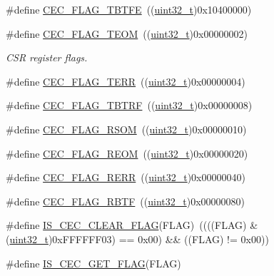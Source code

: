 \begin{DoxyCompactItemize}
\item 
\#define \hyperlink{group___c_e_c__flags__definition_gaae90fd2f95085e113b6943bb35d899ba}{C\+E\+C\+\_\+\+F\+L\+A\+G\+\_\+\+T\+B\+T\+FE}~((\hyperlink{_p_e___types_8h_a33594304e786b158f3fb30289278f5af}{uint32\+\_\+t})0x10400000)
\item 
\#define \hyperlink{group___c_e_c__flags__definition_gad0adfb11294f562f2c8dc555f69e25e0}{C\+E\+C\+\_\+\+F\+L\+A\+G\+\_\+\+T\+E\+OM}~((\hyperlink{_p_e___types_8h_a33594304e786b158f3fb30289278f5af}{uint32\+\_\+t})0x00000002)
\begin{DoxyCompactList}\small\item\em C\+SR register flags. \end{DoxyCompactList}\item 
\#define \hyperlink{group___c_e_c__flags__definition_ga7edc608ca7b4ea74dd4d795fa3214c11}{C\+E\+C\+\_\+\+F\+L\+A\+G\+\_\+\+T\+E\+RR}~((\hyperlink{_p_e___types_8h_a33594304e786b158f3fb30289278f5af}{uint32\+\_\+t})0x00000004)
\item 
\#define \hyperlink{group___c_e_c__flags__definition_gaeb02634fdd06f4ea0990e2cf23cf200e}{C\+E\+C\+\_\+\+F\+L\+A\+G\+\_\+\+T\+B\+T\+RF}~((\hyperlink{_p_e___types_8h_a33594304e786b158f3fb30289278f5af}{uint32\+\_\+t})0x00000008)
\item 
\#define \hyperlink{group___c_e_c__flags__definition_ga4e352d4f48e3b197edf150860703d2bf}{C\+E\+C\+\_\+\+F\+L\+A\+G\+\_\+\+R\+S\+OM}~((\hyperlink{_p_e___types_8h_a33594304e786b158f3fb30289278f5af}{uint32\+\_\+t})0x00000010)
\item 
\#define \hyperlink{group___c_e_c__flags__definition_gaffeaec4eafbf1efbd88139b9bb0654a7}{C\+E\+C\+\_\+\+F\+L\+A\+G\+\_\+\+R\+E\+OM}~((\hyperlink{_p_e___types_8h_a33594304e786b158f3fb30289278f5af}{uint32\+\_\+t})0x00000020)
\item 
\#define \hyperlink{group___c_e_c__flags__definition_gac2376c2b958536ab414574f60cb5d75a}{C\+E\+C\+\_\+\+F\+L\+A\+G\+\_\+\+R\+E\+RR}~((\hyperlink{_p_e___types_8h_a33594304e786b158f3fb30289278f5af}{uint32\+\_\+t})0x00000040)
\item 
\#define \hyperlink{group___c_e_c__flags__definition_gae73c6ec73ab8ad57b18d3bd416baf2d3}{C\+E\+C\+\_\+\+F\+L\+A\+G\+\_\+\+R\+B\+TF}~((\hyperlink{_p_e___types_8h_a33594304e786b158f3fb30289278f5af}{uint32\+\_\+t})0x00000080)
\item 
\#define \hyperlink{group___c_e_c__flags__definition_ga418911667f82a12dd097f7fac7ad4e89}{I\+S\+\_\+\+C\+E\+C\+\_\+\+C\+L\+E\+A\+R\+\_\+\+F\+L\+AG}(F\+L\+AG)~((((F\+L\+AG) \& (\hyperlink{_p_e___types_8h_a33594304e786b158f3fb30289278f5af}{uint32\+\_\+t})0x\+F\+F\+F\+F\+F\+F03) == 0x00) \&\& ((\+F\+L\+A\+G) != 0x00))
\item 
\#define \hyperlink{group___c_e_c__flags__definition_ga929b30d90f6807e9f72976596b0b850b}{I\+S\+\_\+\+C\+E\+C\+\_\+\+G\+E\+T\+\_\+\+F\+L\+AG}(F\+L\+AG)
\end{DoxyCompactItemize}
